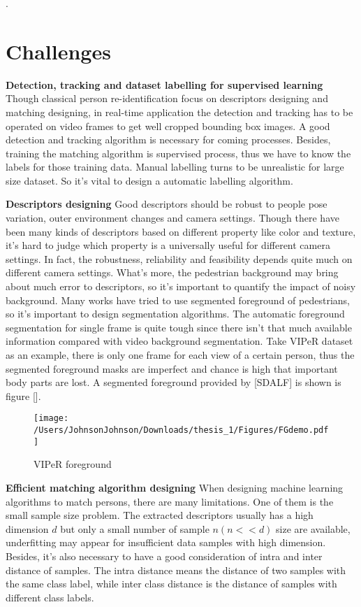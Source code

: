 .

\section{Challenges}

\textbf{Detection, tracking and dataset labelling for supervised learning} Though classical person re-identification focus on descriptors designing and matching designing, in real-time application the detection and tracking has to be operated on video frames to get well cropped bounding box images. A good detection and tracking algorithm is necessary for coming processes. Besides, training the matching algorithm is supervised process, thus we have to know the labels for those training data. Manual labelling turns to be unrealistic for large size dataset. So it's vital to design a automatic labelling algorithm.

\textbf{Descriptors designing} Good descriptors should be robust to people pose variation, outer environment changes and camera settings. Though there have been many kinds of descriptors based on different property like color and texture, it's hard to judge which property is a universally useful for different camera settings. In fact, the robustness, reliability and feasibility depends quite much on different camera settings. What's more, the pedestrian background may bring about much error to descriptors, so it's important to quantify the impact of noisy background. Many works have tried to use segmented foreground of pedestrians, so it's important to design segmentation algorithms. The automatic foreground segmentation for single frame is quite tough since there isn't that much available information compared with video background segmentation. Take VIPeR dataset as an example, there is only one frame for each view of a certain person, thus the segmented foreground masks are imperfect and chance is high that important body parts are lost. A segmented foreground provided by [SDALF] is shown is figure [].
\begin{figure}[H]
\centering
\texttt{[image: /Users/JohnsonJohnson/Downloads/thesis\_1/Figures/FGdemo.pdf]}
\vspace{-2em}
\caption{VIPeR foreground}
\end{figure}
\textbf{Efficient matching algorithm designing} 	
When designing machine learning algorithms to match persons, there are many limitations. One of them is the small sample size problem. The extracted descriptors usually has a high dimension $d$ but only a small number of sample $n(n<<d)$ size are available, underfitting may appear for insufficient data samples with high dimension. Besides, it's also necessary to have a good consideration of intra and inter distance of samples.
The intra distance means the distance of two samples with the same class label, while inter class distance is the distance of samples with different class labels. 

